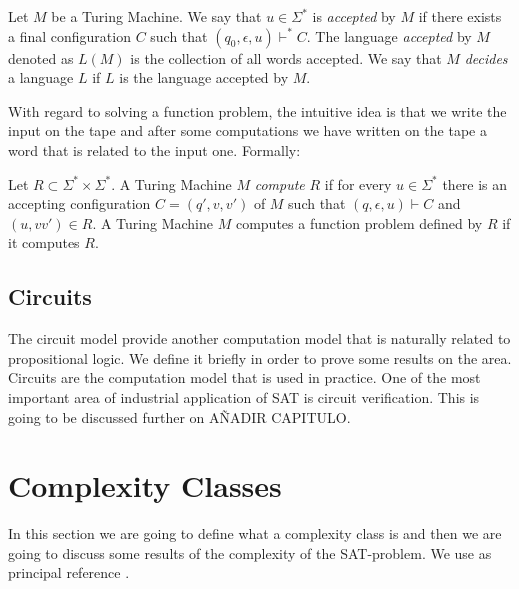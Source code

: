   \begin{definition}
     Let $M$ be a Turing Machine. We say that $u\in\Sigma^*$ is \emph{accepted} by $M$ if there exists a final configuration $C$ such that $(q_0,\epsilon,u)\vdash^* C$. The language \emph{accepted} by $M$ denoted as $L(M)$ is the collection of all words accepted. We say that $M$ \emph{decides} a language $L$ if $L$ is the language accepted by $M$.
  \end{definition}

  With regard to solving a function problem, the intuitive idea is that we write the input on the tape and after some computations we have written on the tape a word that is related to the input one. Formally:


  \begin{definition}
    Let $R\subset\Sigma^*\times \Sigma^*$. A Turing Machine $M$ \emph{compute} $R$ if for every $u\in \Sigma^*$ there is an accepting configuration $C=(q',v,v')$ of $M$  such that $(q,\epsilon,u)\vdash C$ and $(u,vv') \in R$. A Turing Machine $M$ computes a function problem defined by $R$ if it computes $R$.
  \end{definition}


  
\subsection{Circuits}

The circuit model provide another computation model that is naturally related to propositional logic. We define it briefly in order to prove some results on the area. Circuits are the computation model that is used in practice. One of the most important area of industrial application of SAT is circuit verification. This is going to be discussed further on AÑADIR CAPITULO.



\section{Complexity Classes}
\label{sec:complexity}

In this section we are going to define what a complexity class is and then we are going to discuss some results of the complexity of the SAT-problem. We use as principal reference \cite{arora2009computational}.

